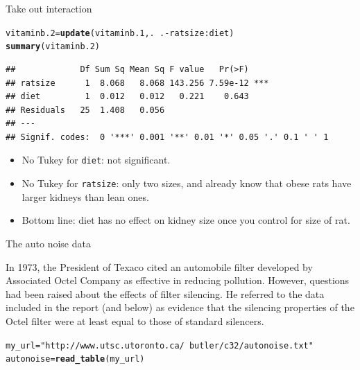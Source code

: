 \documentclass[unknownkeysallowed]{beamer}\usepackage[]{graphicx}\usepackage[]{color}
\makeatletter
\newcommand{\hlstr}[1]{\textcolor[rgb]{0.192,0.494,0.8}{#1}}%
\newcommand{\hlopt}[1]{\textcolor[rgb]{0,0,0}{#1}}%
\newcommand{\hlstd}[1]{\textcolor[rgb]{0.345,0.345,0.345}{#1}}%
\newcommand{\hlkwb}[1]{\textcolor[rgb]{0.69,0.353,0.396}{#1}}%
\newcommand{\hlkwd}[1]{\textcolor[rgb]{0.737,0.353,0.396}{\textbf{#1}}}%
\newenvironment{kframe}{%
 \def\at@end@of@kframe{}%
 \ifinner\ifhmode%
  \def\at@end@of@kframe{\end{minipage}}%
  \begin{minipage}{\columnwidth}%
 \fi\fi%
 \def\FrameCommand##1{\hskip\@totalleftmargin \hskip-\fboxsep
 \colorbox{shadecolor}{##1}\hskip-\fboxsep
     \hskip-\linewidth \hskip-\@totalleftmargin \hskip\columnwidth}%
 \MakeFramed {\advance\hsize-\width
   \@totalleftmargin\z@ \linewidth\hsize
   \@setminipage}}%
 {\par\unskip\endMakeFramed%
 \at@end@of@kframe}
\newenvironment{knitrout}{}{} %
\makeatother
\begin{document}
\begin{frame}[fragile]{Take out interaction}
  
\begin{knitrout}\small
{}\color{fgcolor}\begin{kframe}
\begin{alltt}
\hlstd{vitaminb.2}\hlkwb{=}\hlkwd{update}\hlstd{(vitaminb.1,.}\hlopt{~}\hlstd{.}\hlopt{-}\hlstd{ratsize}\hlopt{:}\hlstd{diet)}
\hlkwd{summary}\hlstd{(vitaminb.2)}
\end{alltt}
\begin{verbatim}
##             Df Sum Sq Mean Sq F value   Pr(>F)    
## ratsize      1  8.068   8.068 143.256 7.59e-12 ***
## diet         1  0.012   0.012   0.221    0.643    
## Residuals   25  1.408   0.056                     
## ---
## Signif. codes:  0 '***' 0.001 '**' 0.01 '*' 0.05 '.' 0.1 ' ' 1
\end{verbatim}
\end{kframe}
\end{knitrout}

\begin{itemize}
\item No Tukey for \texttt{diet}: not significant.
\item No Tukey for \texttt{ratsize}: only two sizes, and already know
  that obese rats have larger kidneys than lean ones.
\item Bottom line: diet has no effect on kidney size once you control
  for size of rat.
\end{itemize}
  
\end{frame}



\begin{frame}[fragile]{The auto noise data}
  
  In 1973, the President of Texaco cited an automobile filter
  developed by Associated Octel Company as effective in reducing
  pollution. However, questions had been raised about the effects of
  filter silencing. He referred to the data included in the report
  (and below) as evidence
  that the silencing properties of the Octel filter were at least
  equal to those of standard silencers. 
 
\begin{knitrout}
\color{fgcolor}\begin{kframe}
\begin{alltt}
\hlstd{my_url}\hlkwb{=}\hlstr{"http://www.utsc.utoronto.ca/~butler/c32/autonoise.txt"}
\hlstd{autonoise}\hlkwb{=}\hlkwd{read_table}\hlstd{(my_url)}
\end{alltt}


{\ttfamily\noindent\bfseries{}}\end{kframe}
\end{knitrout}
  
\end{frame}
\end{document}
